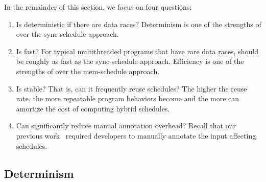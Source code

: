 In the remainder of this section, we focus on four questions:
\begin{enumerate}

\item[\S\ref{sec:deterministic}:] Is \peregrine deterministic if there are
  data races?  Determinism is one of the strengths of \peregrine over the
  sync-schedule approach.

\item[\S\ref{sec:efficient}:] Is \peregrine fast?  For typical multithreaded
  programs that have rare data races, \peregrine should be roughly as fast as
  the sync-schedule approach.  Efficiency is one of the strengths of \peregrine
  over the mem-schedule approach.

\item[\S\ref{sec:stable}:] Is \peregrine stable? That is, can it frequently
  reuse schedules?  The higher the reuse
  rate, the more repeatable program behaviors become and the more \peregrine can
  amortize the cost of computing hybrid schedules.

\item[\S\ref{sec:annotation}:] Can \peregrine significantly reduce manual
  annotation overhead?  Recall that our previous
  work~\cite{cui:tern:osdi10} required developers to manually annotate the
  input affecting schedules.

\end{enumerate}

\subsection{Determinism} \label{sec:deterministic}





